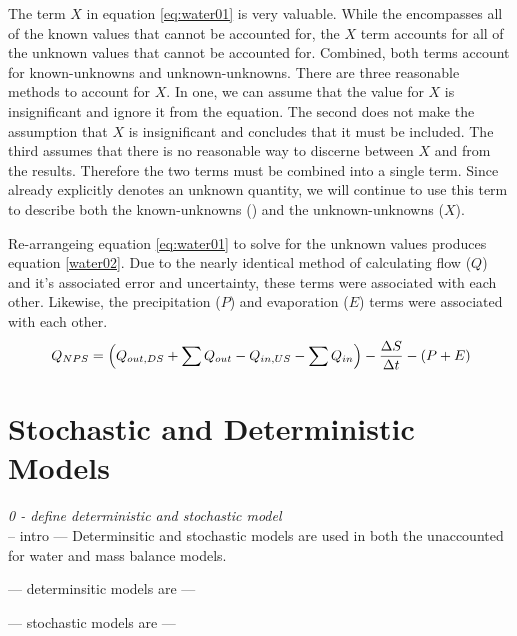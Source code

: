 \begin{linenumbers}
The term $ X $ in equation \ref{eq:water01} is very valuable.  While the \Qnps encompasses all of the known values that cannot be accounted for, the $ X $ term accounts for all of the unknown values that cannot be accounted for.  Combined, both terms account for known-unknowns and unknown-unknowns.  There are three reasonable methods to account for $ X $.  In one, we can assume that the value for $ X $ is insignificant and ignore it from the equation.  The second does not make the assumption that $ X $ is insignificant and concludes that it must be included.  The third assumes that there is no reasonable way to discerne between $ X $ and \Qnps from the results.  Therefore the two terms must be combined into a single term.  Since \Qnps already explicitly denotes an unknown quantity, we will continue to use this term to describe both the known-unknowns (\Qnps) and the unknown-unknowns ($ X $).

Re-arrangeing equation \ref{eq:water01} to solve for the unknown values produces equation \ref{water02}.  Due to the nearly identical method of calculating flow ($ Q $) and it's associated error and uncertainty, these terms were associated with each other.  Likewise, the precipitation ($ P $) and evaporation ($ E $) terms were associated with each other.
\begin{equation}\
Q_{NPS} = \left( Q_{out,DS} + \sum Q_{out} - Q_{in,US} - \sum Q_{in} \right) - \frac{\Delta S}{\Delta t} - \left( P + E \right)\\ \label{water02}
\end{equation}

\clearpage{}
\section{Stochastic and Deterministic Models}
\label{sec:StochAndDetermModels}

\emph{0 - define deterministic and stochastic model}\\

-- intro --- Determinsitic and stochastic models are used in both the unaccounted for water and mass balance models.

--- determinsitic models are ---

--- stochastic models are ---



\end{linenumbers}
